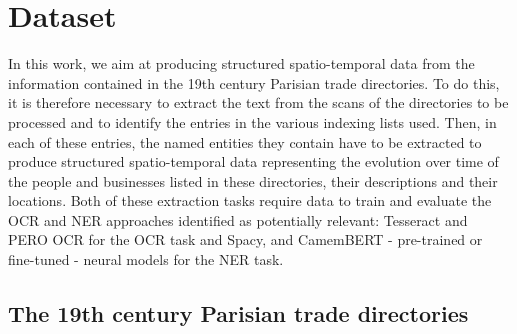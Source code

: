 \section{Dataset}

In this work, we  aim  at  producing  structured  spatio-temporal  data  from the information contained in the 19th century Parisian trade directories. To do this, it is therefore necessary to extract the text from the scans of the directories to be processed and to identify the entries in the various indexing lists used. Then, in each of these entries, the named entities they contain have to be extracted to produce structured spatio-temporal data representing the evolution over time of the people and businesses listed in these directories, their descriptions and their locations. Both of these extraction tasks require data to train and evaluate the OCR and NER approaches identified as potentially relevant: Tesseract and PERO OCR for the OCR task and Spacy, and CamemBERT - pre-trained or fine-tuned - neural models for the NER task.

\subsection{The 19th century Parisian trade directories}

